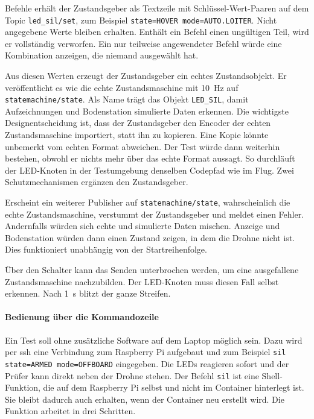             Befehle erhält der Zustandsgeber als Textzeile mit Schlüssel-Wert-Paaren auf dem Topic \texttt{led\_sil/set}, zum Beispiel \texttt{state=HOVER mode=AUTO.LOITER}. Nicht angegebene Werte bleiben erhalten. Enthält ein Befehl einen ungültigen Teil, wird er vollständig verworfen. Ein nur teilweise angewendeter Befehl würde eine Kombination anzeigen, die niemand ausgewählt hat.

            Aus diesen Werten erzeugt der Zustandsgeber ein echtes Zustandsobjekt. Er veröffentlicht es wie die echte Zustandsmaschine mit \SI{10}{\hertz} auf \texttt{statemachine/state}. Als Name trägt das Objekt \texttt{LED\_SIL}, damit Aufzeichnungen und Bodenstation simulierte Daten erkennen. Die wichtigste Designentscheidung ist, dass der Zustandsgeber den Encoder der echten Zustandsmaschine importiert, statt ihn zu kopieren. Eine Kopie könnte unbemerkt vom echten Format abweichen. Der Test würde dann weiterhin bestehen, obwohl er nichts mehr über das echte Format aussagt. So durchläuft der LED-Knoten in der Testumgebung denselben Codepfad wie im Flug. Zwei Schutzmechanismen ergänzen den Zustandsgeber.

            \begin{description}[style=nextline]
                \item[Zweiter Publisher] Erscheint ein weiterer Publisher auf \texttt{statemachine/state}, wahrscheinlich die echte Zustandsmaschine, verstummt der Zustandsgeber und meldet einen Fehler. Andernfalls würden sich echte und simulierte Daten mischen. Anzeige und Bodenstation würden dann einen Zustand zeigen, in dem die Drohne nicht ist. Dies funktioniert unabhängig von der Startreihenfolge.
                \item[Simulierter Ausfall] Über den Schalter kann das Senden unterbrochen werden, um eine ausgefallene Zustandsmaschine nachzubilden. Der LED-Knoten muss diesen Fall selbst erkennen. Nach \SI{1}{\second} blitzt der ganze Streifen.
            \end{description}

            \paragraph{Bedienung über die Kommandozeile}
            Ein Test soll ohne zusätzliche Software auf dem Laptop möglich sein. Dazu wird per \gls{ssh} eine Verbindung zum Raspberry Pi aufgebaut und zum Beispiel \texttt{sil state=ARMED mode=OFFBOARD} eingegeben. Die LEDs reagieren sofort und der Prüfer kann direkt neben der Drohne stehen. Der Befehl \texttt{sil} ist eine Shell-Funktion, die auf dem Raspberry Pi selbst und nicht im Container hinterlegt ist. Sie bleibt dadurch auch erhalten, wenn der Container neu erstellt wird. Die Funktion arbeitet in drei Schritten.

